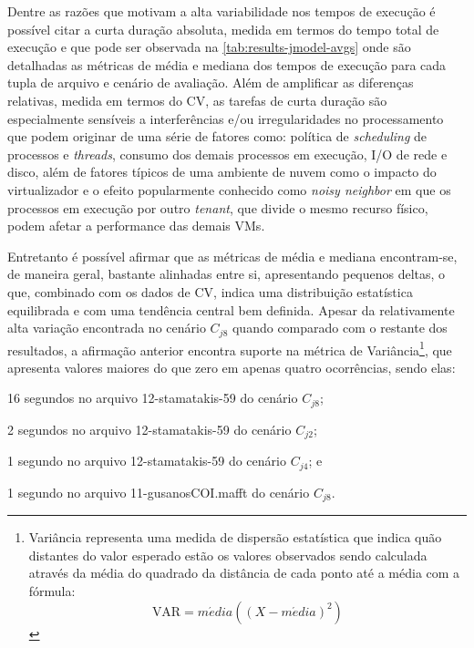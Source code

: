 \documentclass[english,brazilian]{UNISINOSmonografia} %
\begin{document}
Dentre as razões que motivam a alta variabilidade nos tempos de execução é possível citar a curta duração absoluta, medida em termos do tempo total de execução e que pode ser observada na \autoref{tab:results-jmodel-avgs} onde são detalhadas as métricas de média e mediana dos tempos de execução para cada tupla de arquivo e cenário de avaliação.
%
Além de amplificar as diferenças relativas, medida em termos do CV, as tarefas de curta duração são especialmente sensíveis a interferências e/ou irregularidades no processamento que podem originar de uma série de fatores como: política de \textit{scheduling} de processos e \textit{threads}, consumo dos demais processos em execução, I/O de rede e disco, além de fatores típicos de uma ambiente de nuvem como o impacto do virtualizador e o efeito popularmente conhecido como \textit{noisy neighbor} em que os processos em execução por outro \textit{tenant}, que divide o mesmo recurso físico, podem afetar a performance das demais VMs.


Entretanto é possível afirmar que as métricas de média e mediana encontram-se, de maneira geral, bastante alinhadas entre si, apresentando pequenos deltas, o que, combinado com os dados de CV, indica uma distribuição estatística equilibrada e com uma tendência central bem definida.
%
Apesar da relativamente alta variação encontrada no cenário $C_{j8}$ quando comparado com o restante dos resultados, a afirmação anterior encontra suporte na métrica de Variância\footnote{
	Variância representa uma medida de dispersão estatística que indica quão distantes do valor esperado estão os valores observados sendo calculada através da média do quadrado da distância de cada ponto até a média com a fórmula:
	\[ \text{VAR} = m\acute{e}dia\left((X-m\acute{e}dia)^2\right) \]
}, que apresenta valores maiores do que zero em apenas quatro ocorrências, sendo elas:
\begin{inparaenum} 
	\item 16 segundos no arquivo 12-stamatakis-59 do cenário $C_{j8}$;
	\item 2 segundos no arquivo 12-stamatakis-59 do cenário $C_{j2}$;
	\item 1 segundo no arquivo 12-stamatakis-59 do cenário $C_{j4}$; e
	\item 1 segundo no arquivo 11-gusanosCOI.mafft do cenário $C_{j8}$.
\end{inparaenum}
\end{document}
